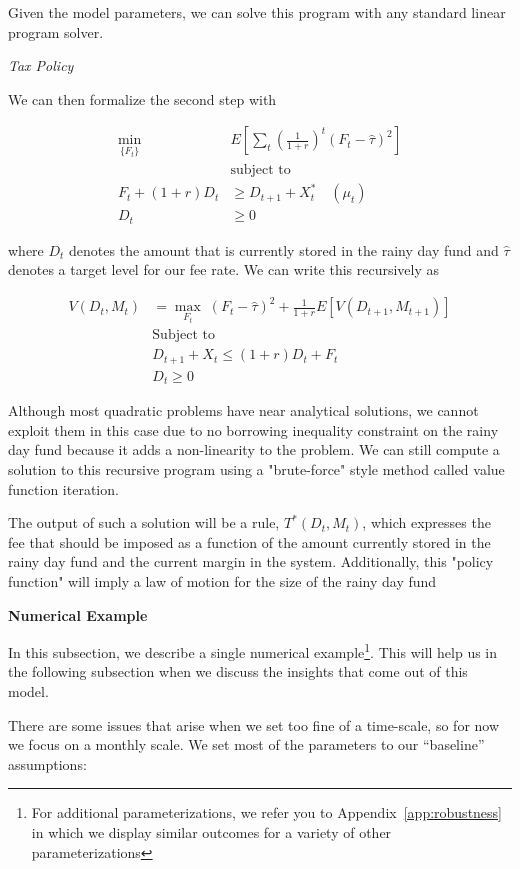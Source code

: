 Given the model parameters, we can solve this program with any standard linear program solver.

\textit{Tax Policy}

We can then formalize the second step with

\begin{align*}
  \min_{\{F_t\}} \; & E \left[ \sum_{t} \left( \frac{1}{1 + r} \right)^t (F_t - \hat{\tau})^2 \right] \\
  &\text{subject to} \\
  F_t + (1 + r) D_t &\geq D_{t+1} + X^*_t \quad (\mu_t) \\
  D_t &\geq 0
\end{align*}

where $D_t$ denotes the amount that is currently stored in the rainy day fund and $\hat{\tau}$
denotes a target level for our fee rate. We can write this recursively as

\begin{align*}
  V(D_t, M_t) &= \max_{F_t} \; (F_t - \hat{\tau})^2 + \frac{1}{1 + r} E [V(D_{t+1}, M_{t+1})] \\
  &\text{Subject to} \\
  &D_{t+1} + X_{t} \leq (1 + r) D_t + F_t \\
  &D_t \geq 0
\end{align*}

Although most quadratic problems have near analytical solutions, we cannot exploit them in this case
due to no borrowing inequality constraint on the rainy day fund because it adds a non-linearity to
the problem. We can still compute a solution to this recursive program using a "brute-force" style
method called value function iteration.

The output of such a solution will be a rule, $T^*(D_t, M_t)$, which expresses the fee that should
be imposed as a function of the amount currently stored in the rainy day fund and the current margin
in the system. Additionally, this "policy function" will imply a law of motion for the size of the
rainy day fund

\textbf{Numerical Example}

In this subsection, we describe a single numerical example\footnote{For additional
parameterizations, we refer you to Appendix~\ref{app:robustness} in which we display similar
outcomes for a variety of other parameterizations}. This will help us in the following subsection
when we discuss the insights that come out of this model.

There are some issues that arise when we set too fine of a time-scale, so for now we focus on a
monthly scale. We set most of the parameters to our ``baseline'' assumptions:

